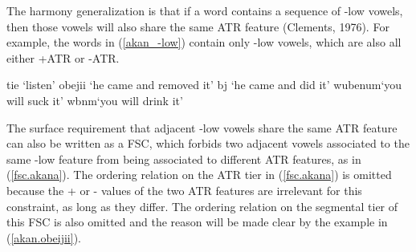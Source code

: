 \documentclass[,doc,floatsintext]{apa6}
\theoremstyle{definition}
\theoremstyle{definition}
\theoremstyle{definition}
\theoremstyle{remark}
\begin{document}
The harmony generalization is that if a word contains a sequence of -low
vowels, then those vowels will also share the same ATR feature
(Clements, 1976). For example, the words in (\ref{akan_-low}) contain
only -low vowels, which are also all either +ATR or -ATR.

\begin{exe}
\label{akan_-low}
\begin{xlist}
  \ex tie `listen'
  \ex obejii `he came and removed it'
  \ex {}bj  `he came and did it'
  \ex wubenum\textraiseglotstop `you will suck it'
  \ex wbnm\textraiseglotstop `you will drink it'
  \end{xlist}
\end{exe}

The surface requirement that adjacent -low vowels share the same ATR
feature can also be written as a FSC, which forbids two adjacent vowels
associated to the same -low feature from being associated to different
ATR features, as in (\ref{fsc.akana}). The ordering relation on the ATR
tier in (\ref{fsc.akana}) is omitted because the + or - values of the
two ATR features are irrelevant for this constraint, as long as they
differ. The ordering relation on the segmental tier of this FSC is also
omitted and the reason will be made clear by the example in
(\ref{akan.obeijii}).

\begin{exe}
\ex \label{fsc.akana}
\end{exe}\newpage
\end{document}
